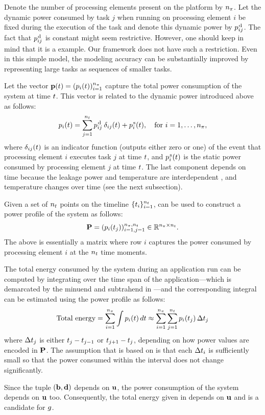 Denote the number of processing elements present on the platform by ${n_\pi}$. Let
the dynamic power consumed by task $j$ when running on processing element $i$ be
fixed during the execution of the task and denote this dynamic power by
$p^{\text{\kern0.1emd}}_{ij}$. The fact that $p^{\text{\kern0.1emd}}_{ij}$ is constant might seem
restrictive. However, one should keep in mind that it is a example. Our
framework does not have such a restriction. Even in this simple model, the
modeling accuracy can be substantially improved by representing large tasks as
sequences of smaller tasks.

Let the vector $\mathbf{p}(t) = (p_i(t))_{i = 1}^{{n_\pi}}$ capture the total power
consumption of the system at time $t$. This vector is related to the dynamic
power introduced above as follows:
\begin{equation} \elab{power}
  \p_i(\t) = \sum_{j = 1}^\nt \p^\dynamic_{ij} \: \delta_{ij} (\t) + \p^\static_i(\t), \hspace{1em} \text{for $i = 1, \dots, \np$},
\end{equation}
where $\delta_{ij}(t)$ is an indicator function (outputs either zero or one) of
the event that processing element $i$ executes task $j$ at time $t$, and
$p^{\text{\kern0.1ems}}_i(t)$ is the static power consumed by processing element $j$ at
time $t$. The last component depends on time because the leakage power and
temperature are interdependent \cite{liu2007}, and temperature changes over time
(see the next subsection).

Given a set of ${n_t}$ points on the timeline $\{ t_i \}_{i = 1}^{n_t}$,
 can be used to construct a power profile of the system as follows:
\[
  \mathbf{P} = (p_i(t_j))_{i = 1, j = 1}^{{n_\pi}, {n_t}} \in \mathbb{R}^{{n_\pi} \times {n_t}}.
\]
The above is essentially a matrix where row $i$ captures the power consumed by
processing element $i$ at the ${n_t}$ time moments.

The total energy consumed by the system during an application run can be
computed by integrating  over the time span of the
application---which is demarcated by the minuend and subtrahend in
---and the corresponding integral can be estimated using
the power profile as follows:
\begin{equation} \elab{total-energy}
  \text{Total energy} = \sum_{i = 1}^\np \int \p_i(\t) \, \d\t \approx \sum_{i = 1}^\np \sum_{j = 1}^\ns \p_i(\t_j) \, \Delta\t_j
\end{equation}
where $\Delta t_j$ is either $t_j - t_{j - 1}$ or $t_{j + 1} - t_j$,
depending on how power values are encoded in $\mathbf{P}$. The assumption that
 is based on is that each $\Delta t_i$ is sufficiently small
so that the power consumed within the interval does not change significantly.

Since the tuple $(\mathbf{b}, \mathbf{d})$ depends on $\mathbf{u}$, the power consumption of the
system depends on $\mathbf{u}$ too. Consequently, the total energy given in
 depends on $\mathbf{u}$ and is a candidate for $g$.
